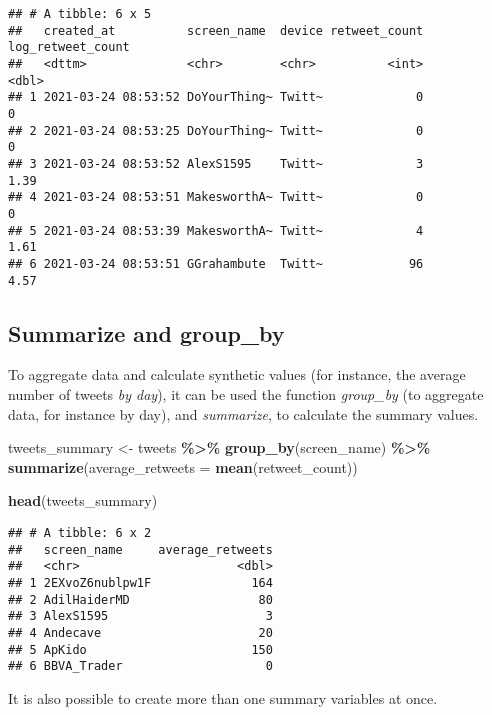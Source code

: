 \documentclass[
]{article}
\newenvironment{Shaded}{\begin{snugshade}}{\end{snugshade}}
\newcommand{\AttributeTok}[1]{\textcolor[rgb]{0.13,0.29,0.53}{#1}}
\newcommand{\FunctionTok}[1]{\textcolor[rgb]{0.13,0.29,0.53}{\textbf{#1}}}
\newcommand{\NormalTok}[1]{#1}
\newcommand{\OtherTok}[1]{\textcolor[rgb]{0.56,0.35,0.01}{#1}}
\newcommand{\SpecialCharTok}[1]{\textcolor[rgb]{0.81,0.36,0.00}{\textbf{#1}}}
\begin{document}
\begin{verbatim}
## # A tibble: 6 x 5
##   created_at          screen_name  device retweet_count log_retweet_count
##   <dttm>              <chr>        <chr>          <int>             <dbl>
## 1 2021-03-24 08:53:52 DoYourThing~ Twitt~             0              0   
## 2 2021-03-24 08:53:25 DoYourThing~ Twitt~             0              0   
## 3 2021-03-24 08:53:52 AlexS1595    Twitt~             3              1.39
## 4 2021-03-24 08:53:51 MakesworthA~ Twitt~             0              0   
## 5 2021-03-24 08:53:39 MakesworthA~ Twitt~             4              1.61
## 6 2021-03-24 08:53:51 GGrahambute  Twitt~            96              4.57
\end{verbatim}

\subsection{Summarize and group\_by}\label{summarize-and-group_by}

To aggregate data and calculate synthetic values (for instance, the average number of tweets \emph{by day}), it can be used the function \emph{group\_by} (to aggregate data, for instance by day), and \emph{summarize}, to calculate the summary values.

\begin{Shaded}
\begin{Highlighting}[]
\NormalTok{tweets\_summary }\OtherTok{\textless{}{-}}\NormalTok{ tweets }\SpecialCharTok{\%\textgreater{}\%}
  \FunctionTok{group\_by}\NormalTok{(screen\_name) }\SpecialCharTok{\%\textgreater{}\%}
  \FunctionTok{summarize}\NormalTok{(}\AttributeTok{average\_retweets =} \FunctionTok{mean}\NormalTok{(retweet\_count))}

\FunctionTok{head}\NormalTok{(tweets\_summary)}
\end{Highlighting}
\end{Shaded}

\begin{verbatim}
## # A tibble: 6 x 2
##   screen_name     average_retweets
##   <chr>                      <dbl>
## 1 2EXvoZ6nublpw1F              164
## 2 AdilHaiderMD                  80
## 3 AlexS1595                      3
## 4 Andecave                      20
## 5 ApKido                       150
## 6 BBVA_Trader                    0
\end{verbatim}

It is also possible to create more than one summary variables at once.
\end{document}
